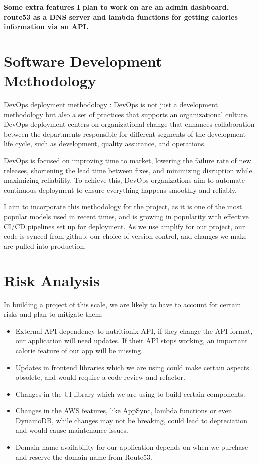 \bigskip

\textbf{Some extra features I plan to work on are an admin dashboard, route53 as a DNS server and lambda functions for 
getting calories information via an API.}

\clearpage

\section{Software Development Methodology}

DevOps deployment methodology : DevOps is not just a development methodology but also a set of practices that supports an organizational culture. DevOps deployment centers on organizational change that enhances collaboration between the departments responsible for different segments of the development life cycle, such as development, quality assurance, and operations.

\bigskip

DevOps is focused on improving time to market, lowering the failure rate of new releases, shortening the lead time between fixes, and minimizing disruption while maximizing reliability. To achieve this, DevOps organizations aim to automate continuous deployment to ensure everything happens smoothly and reliably.

\bigskip

I aim to incorporate this methodology for the project, as it is one of the most popular models used in recent times, and is growing in popularity with effective CI/CD pipelines set up for deployment. As we use amplify for our project, our code is synced from github, our choice of version control, and changes we make are pulled into production.


\section{Risk Analysis}

In building a project of this scale, we are likely to have to account for certain risks and plan to mitigate them: 

\begin{itemize}
  \item External API dependency to nutritionix API, if they change the API format, our application will need updates. If their API stops working, an important calorie feature of our app will be missing.
  \item Updates in frontend libraries which we are using could make certain aspects obsolete, and would require a code review and refactor.
  \item Changes in the UI library which we are using to build certain components.
  \item Changes in the AWS features, like AppSync, lambda functions or even DynamoDB, while changes may not be breaking, could lead to depreciation and would cause maintenance issues.
  \item Domain name availability for our application depends on when we purchase and reserve the domain name from Route53.
\end{itemize}

